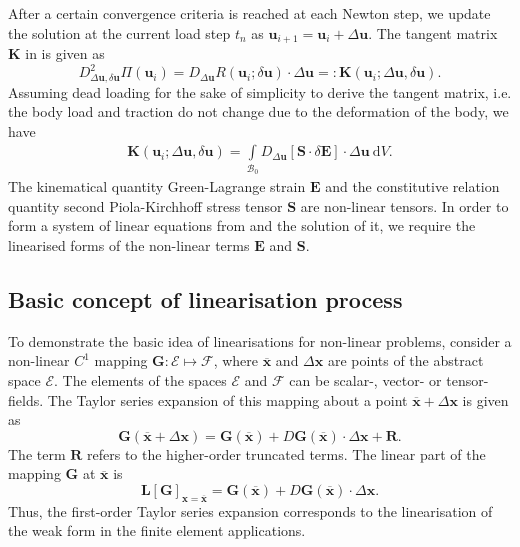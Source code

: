 After a certain convergence criteria is reached at each Newton step, we update the solution at the current load step $t_n$ as $\mathbf{u}_{i+1} = \mathbf{u}_i + \Delta \mathbf{u}$. The tangent matrix $\mathbf{K}$ in  is given as 
\begin{equation}
D^2_{\Delta\mathbf{u}, \delta\mathbf{u}} \Pi(\mathbf{u}_{i}) = D_{\Delta\mathbf{u}} R(\mathbf{u}_i; \delta \mathbf{u}) \cdot \Delta\mathbf{u} =: \mathbf{K}(\mathbf{u}_i; \Delta\mathbf{u}, \delta \mathbf{u}).
\end{equation}
Assuming dead loading for the sake of simplicity to derive the tangent matrix, i.e. the body load and traction do not change due to the deformation of the body, we have
\begin{align}
\mathbf{K}(\mathbf{u}_i; \Delta\mathbf{u}, \delta \mathbf{u}) = \int\limits_{\mathcal{B}_0} D_{\Delta\mathbf{u}} \left[ \mathbf{S} \cdot \delta \mathbf{E} \right] \cdot \Delta\mathbf{u} \ \mathrm{d}V.
\label{eq:2.15}
\end{align}
The kinematical quantity Green-Lagrange strain $\mathbf{E}$ and the constitutive relation quantity second Piola-Kirchhoff stress tensor $\mathbf{S}$ are non-linear tensors. In order to form a system of linear equations from  and the solution of it, we require the linearised forms of the non-linear terms $\mathbf{E}$ and $\mathbf{S}$.
\subsection{Basic concept of linearisation process}
To demonstrate the basic idea of linearisations for non-linear problems, consider a non-linear $C^1$ mapping $\mathbf{G}: \mathcal{E} \mapsto \mathcal{F}$, where $\overline{\mathbf{x}}$ and $\Delta\mathbf{x}$ are points of the abstract space $\mathcal{E}$. The elements of the spaces $\mathcal{E}$ and $\mathcal{F}$ can be scalar-, vector- or tensor-fields. The Taylor series expansion of this mapping about a point $\overline{\mathbf{x}} + \Delta\mathbf{x}$ is given as
\begin{equation}
\mathbf{G}(\overline{\mathbf{x}} + \Delta\mathbf{x}) = \mathbf{G}(\overline{\mathbf{x}}) + D \mathbf{G}(\overline{\mathbf{x}}) \cdot \Delta\mathbf{x} + \mathbf{R}.
\end{equation}
The term $\mathbf{R}$ refers to the higher-order truncated terms. The linear part of the mapping $\mathbf{G}$ at $\overline{\mathbf{x}}$ is 
\begin{equation}
\mathbf{L} \left[ \mathbf{G} \right]_{\mathbf{x} = \overline{\mathbf{x}}} = \mathbf{G}(\overline{\mathbf{x}}) + D \mathbf{G}(\overline{\mathbf{x}}) \cdot \Delta\mathbf{x}.
\end{equation} 
Thus, the first-order Taylor series expansion corresponds to the linearisation of the weak form in the finite element applications. 

